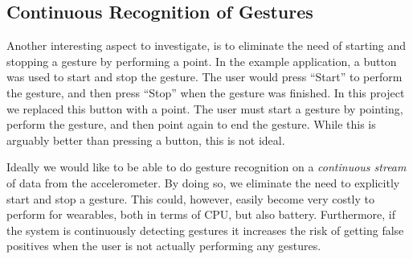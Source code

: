 \subsection{Continuous Recognition of Gestures}

Another interesting aspect to investigate, 
is to eliminate the need of starting and stopping a gesture by performing a point. 
In the \threedollar example application, 
a button was used to start and stop the gesture. 
The user would press ``Start'' to perform the gesture, 
and then press ``Stop'' when the gesture was finished. 
In this project we replaced this button with a point. 
The user must start a gesture by pointing, 
perform the gesture, 
and then point again to end the gesture. 
While this is arguably better than pressing a button, 
this is not ideal.

Ideally we would like to be able to do gesture recognition on a \emph{continuous stream} of data from the accelerometer. 
By doing so, we eliminate the need to explicitly start and stop a gesture.
This could, however, easily become very costly to perform for wearables,
both in terms of CPU, but also battery. Furthermore, if the system is continuously detecting gestures it increases the risk of getting false positives when the user is not actually performing any gestures.

